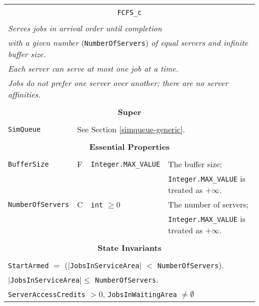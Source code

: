 \documentclass[12pt]{book}
\begin{document}
\begin{tabular}{|l|l|l|l|}
\hline
\multicolumn{4}{|c|}{} \\
\multicolumn{4}{|c|}{\lstinline[basicstyle=\large]{FCFS_c}} \\
\multicolumn{4}{|c|}{} \\
\hline
\multicolumn{4}{|l|}{\em Serves jobs in arrival order until completion\/} \\
\multicolumn{4}{|l|}{{\em with a given number\/} (\lstinline|NumberOfServers|)
                     {\em of equal servers and infinite buffer size.}} \\
\multicolumn{4}{|l|}{\em Each server can serve at most one job at a time.} \\
\multicolumn{4}{|l|}{\em Jobs do not prefer one server over another; there are no server affinities.} \\
\hline
\multicolumn{4}{|c|}{} \\
\multicolumn{4}{|c|}{\bf Super} \\
\multicolumn{4}{|c|}{} \\
\hline
\lstinline|SimQueue| & \multicolumn{3}{|l|}{See Section \ref{simqueue-generic}.} \\
\hline
\multicolumn{4}{|c|}{} \\
\multicolumn{4}{|c|}{\bf Essential Properties} \\
\multicolumn{4}{|c|}{} \\
\hline
\lstinline|BufferSize|      & F & \lstinline|Integer.MAX_VALUE|
                            & The buffer size; \\
                        & & & \lstinline|Integer.MAX_VALUE| is treated as $+\infty$. \\
\hline
\lstinline|NumberOfServers| & C & \lstinline|int| $\geq 0$
                            & The number of servers; \\
                        & & & \lstinline|Integer.MAX_VALUE| is treated as $+\infty$. \\
\hline
\multicolumn{4}{|c|}{} \\
\multicolumn{4}{|c|}{\bf State  Invariants} \\
\multicolumn{4}{|c|}{} \\
\hline
\multicolumn{4}{|l|}{\lstinline|StartArmed| $=$ ($|$\lstinline|JobsInServiceArea|$|$ $<$ \lstinline|NumberOfServers|).} \\
\multicolumn{4}{|l|}{$|$\lstinline|JobsInServiceArea|$| \leq$ \lstinline|NumberOfServers|.} \\
\multicolumn{4}{|l|}{\lstinline|ServerAccessCredits| $> 0$, \lstinline|JobsInWaitingArea| $\neq \emptyset$} \\

\end{tabular}
\end{document}
